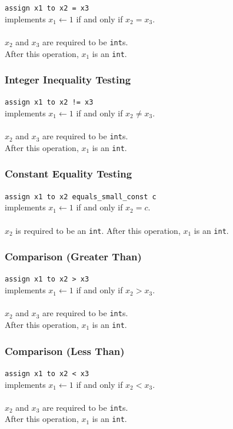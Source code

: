 \documentclass[11pt]{report}
\begin{document}
\texttt{assign x1 to x2 = x3} \\
implements $x_1 \leftarrow 1$ if and only if $x_2 = x_3$. \\ \\
$x_2$ and $x_3$ are required to be \texttt{int}s. \\
After this operation, $x_1$ is an \texttt{int}.

\subsubsection{Integer Inequality Testing}

\texttt{assign x1 to x2 != x3} \\
implements $x_1 \leftarrow 1$ if and only if $x_2 \not= x_3$. \\ \\
$x_2$ and $x_3$ are required to be \texttt{int}s. \\
After this operation, $x_1$ is an \texttt{int}.

\subsubsection{Constant Equality Testing}

\texttt{assign x1 to x2 equals\_small\_const c} \\
implements $x_1 \leftarrow 1$ if and only if $x_2 = c$. \\ \\
$x_2$ is required to be an \texttt{int}.
After this operation, $x_1$ is an \texttt{int}.

\subsubsection{Comparison (Greater Than)}

\texttt{assign x1 to x2 > x3} \\
implements $x_1 \leftarrow 1$ if and only if $x_2 > x_3$. \\ \\
$x_2$ and $x_3$ are required to be \texttt{int}s. \\
After this operation, $x_1$ is an \texttt{int}.

\subsubsection{Comparison (Less Than)}

\texttt{assign x1 to x2 < x3} \\
implements $x_1 \leftarrow 1$ if and only if $x_2 < x_3$. \\ \\
$x_2$ and $x_3$ are required to be \texttt{int}s. \\
After this operation, $x_1$ is an \texttt{int}.
\end{document}
